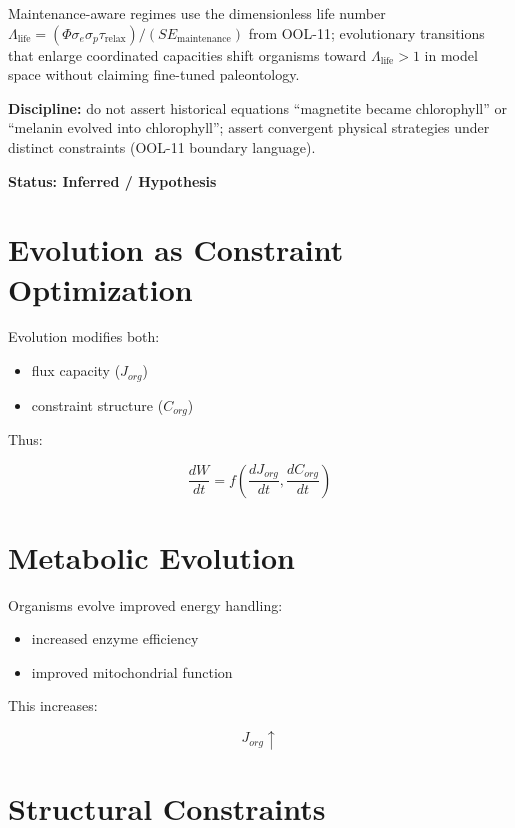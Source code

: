\documentclass[11pt]{article}
\begin{document}
Maintenance-aware regimes use the dimensionless life number $\Lambda_{\mathrm{life}} = (\Phi \sigma_e \sigma_p \tau_{\mathrm{relax}})/(S E_{\mathrm{maintenance}})$ from OOL-11; evolutionary transitions that enlarge coordinated capacities shift organisms toward $\Lambda_{\mathrm{life}}>1$ in model space without claiming fine-tuned paleontology.

\textbf{Discipline:} do not assert historical equations ``magnetite became chlorophyll'' or ``melanin evolved into chlorophyll''; assert convergent physical strategies under distinct constraints (OOL-11 boundary language).

\textbf{Status: Inferred / Hypothesis}

\section{Evolution as Constraint Optimization}

Evolution modifies both:

\begin{itemize}
    \item flux capacity ($J_{org}$)
    \item constraint structure ($C_{org}$)
\end{itemize}

Thus:

\begin{equation}
\frac{dW}{dt} = f\left(\frac{dJ_{org}}{dt}, \frac{dC_{org}}{dt}\right)
\end{equation}

\section{Metabolic Evolution}

Organisms evolve improved energy handling:

\begin{itemize}
    \item increased enzyme efficiency
    \item improved mitochondrial function
\end{itemize}

This increases:

\begin{equation}
J_{org} \uparrow
\end{equation}

\section{Structural Constraints}
\end{document}
